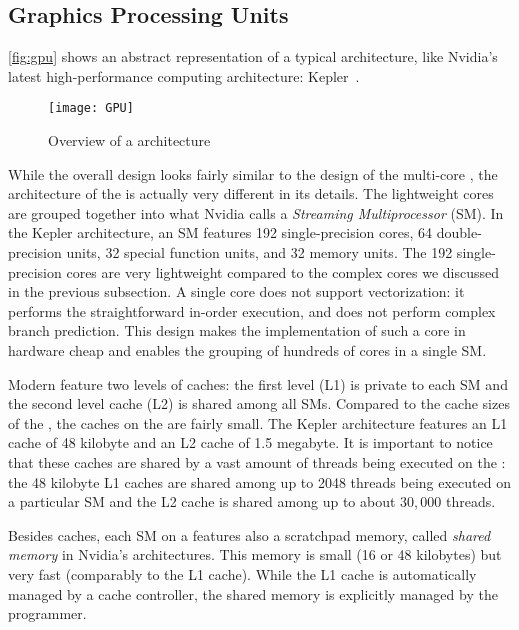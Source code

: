 \subsection[Graphics Processing Units (\GPUs)]{Graphics Processing Units}
\autoref{fig:gpu} shows an abstract representation of a typical \GPU architecture, like Nvidia's latest high-performance computing \GPU architecture: Kepler~\cite{CUDAKepler2012}.
\begin{figure}
  \centering
  \texttt{[image: GPU]}
  \caption{Overview of a \GPU architecture}
  \label{fig:gpu}
\end{figure}
While the overall design looks fairly similar to the design of the multi-core \CPU, the architecture of the \GPU is actually very different in its details.
The lightweight \GPU cores are grouped together into what Nvidia calls a \emph{Streaming Multiprocessor} (SM).
In the Kepler architecture, an SM features 192 single-precision cores, 64 double-precision units, 32 special function units, and 32 memory units.
The 192 single-precision cores are very lightweight compared to the complex \CPU cores we discussed in the previous subsection.
A single \GPU core does not support \SIMD vectorization:
it performs the straightforward in-order execution, and does not perform complex branch prediction.
This design makes the implementation of such a core in hardware cheap and enables the grouping of hundreds of cores in a single SM.

Modern \GPUs feature two levels of caches:
the first level (L1) is private to each SM and the second level cache (L2) is shared among all SMs.
Compared to the cache sizes of the \CPU, the caches on the \GPU are fairly small.
The Kepler architecture features an L1 cache of 48 kilobyte and an L2 cache of 1.5 megabyte.
It is important to notice that these caches are shared by a vast amount of threads being executed on the \GPU:
the 48 kilobyte L1 caches are shared among up to 2048 threads being executed on a particular SM and the L2 cache is shared among up to about 30,\,000 threads.

Besides caches, each SM on a \GPU features also a scratchpad memory, called \emph{shared memory} in Nvidia's \GPU architectures.
This memory is small (16 or 48 kilobytes) but very fast (comparably to the L1 cache).
While the L1 cache is automatically managed by a cache controller, the shared memory is explicitly managed by the programmer.

